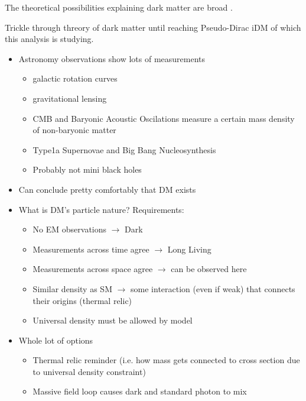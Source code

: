 The theoretical possibilities explaining dark matter are broad \cite{darksectors-2016}.

Trickle through threory of dark matter until reaching Pseudo-Dirac iDM of which
this analysis is studying.

\begin{itemize}
    \item Astronomy observations show lots of measurements
          \begin{itemize}
              \item galactic rotation curves \cite{rubin-rotationcurve-1980,rotationcurve-2000}
              \item gravitational lensing \cite{gravlensing-2004}
              \item CMB and Baryonic Acoustic Oscilations measure a certain mass density of non-baryonic matter
              \item Type1a Supernovae \cite{type1a-supernova-2010} and Big Bang Nucleosynthesis \cite{nucleosynthesis-1998}
              \item Probably not mini black holes \cite{constraints-primordial-black-holes-2021}
          \end{itemize}
    \item Can conclude pretty comfortably that DM exists
    \item What is DM's particle nature? Requirements:
          \begin{itemize}
              \item No EM observations $\rightarrow$ Dark
              \item Measurements across time agree $\rightarrow$ Long Living
              \item Measurements across space agree $\rightarrow$ can be observed here
              \item Similar density as SM $\rightarrow$ some interaction (even if weak) that connects their origins (thermal relic)
              \item Universal density must be allowed by model
          \end{itemize}
    \item Whole lot of options
          \begin{itemize}
              \item Thermal relic reminder (i.e. how mass gets connected to cross section due to universal density constraint) \cite{thermal-freezeout-diagram-1996}
              \item Massive field loop causes dark and standard photon to mix

\end{itemize}
\end{itemize}
